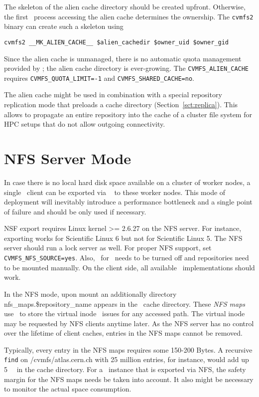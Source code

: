 The skeleton of the alien cache directory should be created upfront.
Otherwise, the first \cvmfs\ process accessing the alien cache determines the ownership.
The \texttt{cvmfs2} binary can create such a skeleton using
\begin{verbatim}
cvmfs2 __MK_ALIEN_CACHE__ $alien_cachedir $owner_uid $owner_gid
\end{verbatim}

Since the alien cache is unmanaged, there is no automatic quota management provided by \cvmfs; the alien cache directory is ever-growing.
The \texttt{CVMFS\_ALIEN\_CACHE} requires \texttt{CVMFS\_QUOTA\_LIMIT=-1} and \texttt{CVMFS\_SHARED\_CACHE=no}.

The alien cache might be used in combination with a special repository replication mode that preloads a cache directory (\cf Section~\ref{sct:replica}).
This allows to propagate an entire repository into the cache of a cluster file system for HPC setups that do not allow outgoing connectivity.

\section{NFS Server Mode}
In case there is no local hard disk space available on a cluster of worker nodes, a single \cvmfs\ client can be exported via \nfs~\cite{rfc1813,rfc3530} to these worker nodes.
This mode of deployment will inevitably introduce a performance bottleneck and a single point of failure and should be only used if necessary.

NSF export requires Linux kernel >= 2.6.27 on the NFS server.
For instance, exporting works for Scientific Linux 6 but not for Scientific Linux 5.
The NFS server should run a lock server as well.
For proper NFS support, set \texttt{CVMFS\_NFS\_SOURCE=yes}. 
Also, \autofs\ for \cvmfs\ needs to be turned off and repositories need to be mounted manually.
On the client side, all available \nfs\ implementations should work.

In the NFS mode, upon mount an additionally directory nfs\_maps.\$repository\_name appears in the \cvmfs\ cache directory.
These \emph{NFS maps} use \leveldb\ to store the virtual inode \cvmfs\ issues for any accessed path.
The virtual inode may be requested by NFS clients anytime later.
As the NFS server has no control over the lifetime of client caches, entries in the NFS maps cannot be removed.

Typically, every entry in the NFS maps requires some 150-200 Bytes. 
A recursive \texttt{find} on /cvmfs/atlas.cern.ch with 25 million entries, for instance, would add up \SI{5}{\giga\byte} in the cache directory. 
For a \cvmfs\ instance that is exported via NFS, the safety margin for the NFS maps needs be taken into account.
It also might be necessary to monitor the actual space consumption.

